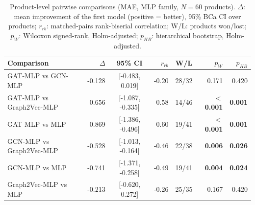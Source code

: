 \begin{table}[ht]
\centering\small
\caption{Product-level pairwise comparisons (MAE, MLP family, $N=60$ products). $\Delta$: mean improvement of the first model (positive = better), 95\% BCa CI over products; $r_{rb}$: matched-pairs rank-biserial correlation; W/L: products won/lost; $p_{W}$: Wilcoxon signed-rank, Holm-adjusted; $p_{HB}$: hierarchical bootstrap, Holm-adjusted.}
\label{tab:pairwise_mae_mlp}
\begin{tabular}{lrcrcrr}
\toprule
Comparison & $\Delta$ & 95\% CI & $r_{rb}$ & W/L & $p_{W}$ & $p_{HB}$ \\
\midrule
GAT-MLP vs GCN-MLP & -0.128 & [-0.483, 0.019] & -0.20 & 28/32 & 0.171 & 0.420 \\
GAT-MLP vs Graph2Vec-MLP & -0.656 & [-1.087, -0.335] & -0.58 & 14/46 & \textbf{$<$0.001} & \textbf{0.001} \\
GAT-MLP vs MLP & -0.869 & [-1.386, -0.496] & -0.60 & 19/41 & \textbf{$<$0.001} & \textbf{0.001} \\
GCN-MLP vs Graph2Vec-MLP & -0.528 & [-1.013, -0.164] & -0.46 & 22/38 & \textbf{0.006} & \textbf{0.026} \\
GCN-MLP vs MLP & -0.741 & [-1.371, -0.258] & -0.49 & 19/41 & \textbf{0.004} & \textbf{0.024} \\
Graph2Vec-MLP vs MLP & -0.213 & [-0.620, 0.272] & -0.26 & 25/35 & 0.167 & 0.420 \\
\bottomrule
\end{tabular}
\end{table}
